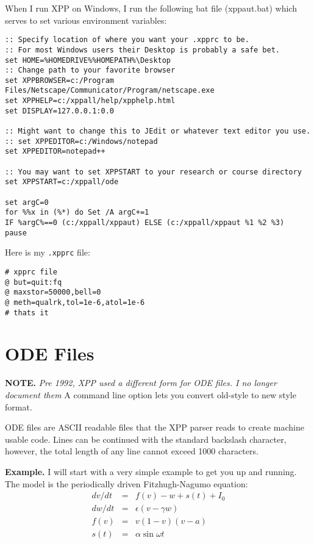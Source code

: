 \documentclass{article}
\newcommand{\beqa}{\begin{eqnarray}}
\newcommand{\eeqa}{\end{eqnarray}}
\newcommand{\tc}[1]{\addcontentsline{toc}{subsection}{#1}}
\begin{document}
When I run XPP on {Windows}, I run the following bat file (xppaut.bat) which serves
to set various environment variables:
{\color{red}
\begin{verbatim}
:: Specify location of where you want your .xpprc to be.
:: For most Windows users their Desktop is probably a safe bet.
set HOME=%HOMEDRIVE%%HOMEPATH%\Desktop
:: Change path to your favorite browser
set XPPBROWSER=c:/Program Files/Netscape/Communicator/Program/netscape.exe
set XPPHELP=c:/xppall/help/xpphelp.html
set DISPLAY=127.0.0.1:0.0

:: Might want to change this to JEdit or whatever text editor you use.
:: set XPPEDITOR=c:/Windows/notepad
set XPPEDITOR=notepad++

:: You may want to set XPPSTART to your research or course directory
set XPPSTART=c:/xppall/ode

set argC=0
for %%x in (%*) do Set /A argC+=1
IF %argC%==0 (c:/xppall/xppaut) ELSE (c:/xppall/xppaut %1 %2 %3)
pause
\end{verbatim}}

Here is my {\tt .xpprc} file:
{\color{red}\begin{verbatim}
# xpprc file
@ but=quit:fq
@ maxstor=50000,bell=0
@ meth=qualrk,tol=1e-6,atol=1e-6
# thats it
\end{verbatim}}

\section{ODE Files}

{\bf NOTE.}  {\em Pre 1992, XPP used a different form for ODE files. I no longer document them}  A command line option lets you convert old-style to
new style format.


ODE files are ASCII readable files that the XPP parser reads to create
 machine usable code. Lines can be continued with the standard
backslash character, however, the total length of any line cannot
exceed 1000 characters.

\bigskip
\tc{Example}
{\bf Example.} 
I will start with a very simple example to get you up and running. The
model is the periodically driven Fitzhugh-Nagumo equation:
\beqa
dv/dt &=& f(v)-w+s(t)+I_0 \\
dw/dt &=& \epsilon(v-\gamma w) \\
f(v) &=& v(1-v)(v-a) \\
s(t) &=& \alpha \sin \omega t
\eeqa
\end{document}
